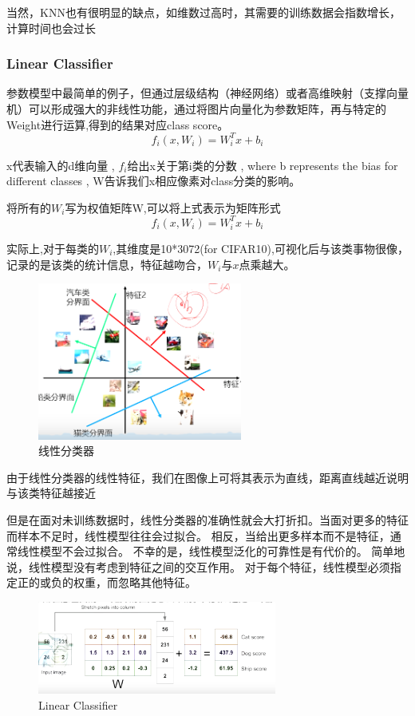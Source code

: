 \documentclass[12pt]{article}
\begin{document}
当然，KNN也有很明显的缺点，如维数过高时，其需要的训练数据会指数增长，计算时间也会过长

\subsubsection{Linear Classifier}
参数模型中最简单的例子，但通过层级结构（神经网络）或者高维映射（支撑向量机）可以形成强大的非线性功能，通过将图片向量化为参数矩阵，再与特定的Weight进行运算,得到的结果对应class score。
\\$$f_i(x,W_i)=W_i^Tx+b_i$$

x代表输入的d维向量 , $f_i $给出x关于第i类的分数 , where b represents the bias for different classes , W告诉我们x相应像素对class分类的影响。

将所有的$W_i$写为权值矩阵W,可以将上式表示为矩阵形式
\\$$f_i(x,W_i)=W_i^Tx+b_i$$

实际上,对于每类的$W_i$,其维度是10*3072(for CIFAR10),可视化后与该类事物很像，记录的是该类的统计信息，特征越吻合，$W_i$与$x$点乘越大。
\begin{figure}[ht]  %
\centering
\includegraphics[width=0.6\textwidth]{pic16.png}
\caption{线性分类器}
\end{figure}

由于线性分类器的线性特征，我们在图像上可将其表示为直线，距离直线越近说明与该类特征越接近

但是在面对未训练数据时，线性分类器的准确性就会大打折扣。当面对更多的特征而样本不足时，线性模型往往会过拟合。 相反，当给出更多样本而不是特征，通常线性模型不会过拟合。 不幸的是，线性模型泛化的可靠性是有代价的。 简单地说，线性模型没有考虑到特征之间的交互作用。 对于每个特征，线性模型必须指定正的或负的权重，而忽略其他特征。
\begin{figure}[ht]  %
\centering
\includegraphics[width=0.7\textwidth]{pic6.png}
\caption{Linear Classifier}
\end{figure}
\end{document}
